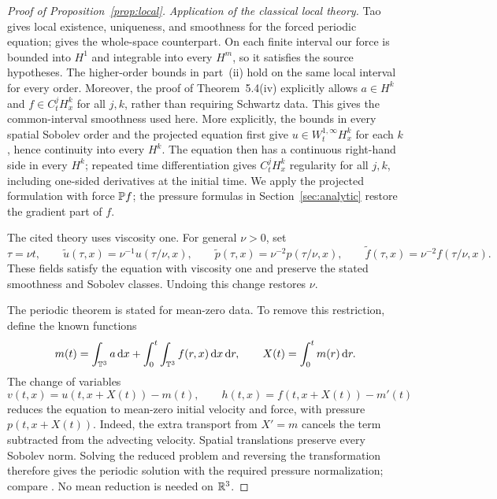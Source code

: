 \begin{proof}[Proof of Proposition~\ref{prop:local}]
\emph{Application of the classical local theory.}
Tao~\cite[Theorem~5.1(ii)--(iv)]{tao2013} gives local existence,
uniqueness, and smoothness for the forced periodic equation;
\cite[Theorem~5.4(ii)--(iv)]{tao2013} gives the whole-space counterpart.
On each finite interval our force is bounded into $H^1$ and integrable
into every $H^m$, so it satisfies the source hypotheses. The higher-order
bounds in part~(ii) hold on the same local interval for every order.
Moreover, the proof of Theorem~5.4(iv) explicitly allows
$a\in H^k$ and $f\in C^j_tH^k_x$ for all $j,k$, rather than requiring
Schwartz data. This gives the common-interval smoothness used here.
More explicitly, the bounds in every spatial Sobolev order and the
projected equation first give $u\in W^{1,\infty}_tH^k_x$ for each $k$,
hence continuity into every $H^k$. The equation then has a continuous
right-hand side in every $H^k$; repeated time differentiation gives
$C^j_tH^k_x$ regularity for all $j,k$, including one-sided derivatives
at the initial time. We apply the projected formulation with force $\mathbb P f$; the pressure
formulas in Section~\ref{sec:analytic} restore the gradient part of $f$.

The cited theory uses viscosity one. For general $\nu>0$, set
\[
 \tau=\nu t,\qquad
 \widetilde u(\tau,x)=\nu^{-1}u(\tau/\nu,x),\qquad
 \widetilde p(\tau,x)=\nu^{-2}p(\tau/\nu,x),\qquad
 \widetilde f(\tau,x)=\nu^{-2}f(\tau/\nu,x).
\]
These fields satisfy the equation with viscosity one and preserve the
stated smoothness and Sobolev classes. Undoing this change restores $\nu$.

The periodic theorem is stated for mean-zero data. To remove this
restriction, define the known functions
\[
 m(t)=\int_{\mathbb T^3}a\,\mathrm d x+\int_0^t\int_{\mathbb T^3}f(r,x)\,\mathrm d x\,\mathrm d r,
 \qquad X(t)=\int_0^t m(r)\,\mathrm d r.
\]
The change of variables
\[
 v(t,x)=u(t,x+X(t))-m(t),\qquad
 h(t,x)=f(t,x+X(t))-m'(t)
\]
reduces the equation to mean-zero initial velocity and force, with
pressure $p(t,x+X(t))$. Indeed, the extra transport from $X'=m$
cancels the term subtracted from the advecting velocity. Spatial
translations preserve every Sobolev norm. Solving the reduced problem
and reversing the transformation therefore gives the periodic solution
with the required pressure normalization; compare
\cite[Section~3, equations~(36)--(38)]{tao2013}. No mean reduction is
needed on $\mathbb R^3$.


\end{proof}
